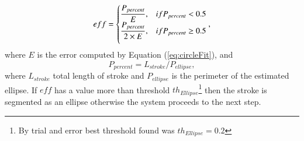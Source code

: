 \documentclass[preprint,10pt,5p,twocolumn]{elsarticle}
\begin{document}
 \begin{equation}
eff= \begin{cases} 
\displaystyle \frac{P_{percent}}{E},&if P_{percent}< 0.5 \\ \medskip
\displaystyle  \frac{P_{percent}}{2\times E},&if P_{percent}\geq 0.5 \\
\end{cases},
\label{eq:circleError}
\end{equation}
 where $E$ is the error computed by Equation (\ref{eq:circleFit}), and 
\[
P_{percent}  = L_{stroke} /P_{ellipse}, 
\]
 where $L_{stroke}$ total length of stroke and $P_{ellipse} $ is the perimeter of the estimated ellipse. If $eff$ has a value more than threshold $th_{Ellipse}$\footnote{By trial and error best threshold found was $th_{Ellipse}=0.2$} then the stroke is segmented as an ellipse otherwise the system proceeds to the next step. 
\end{document}
